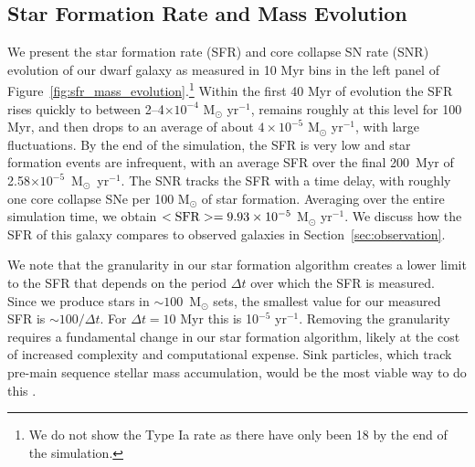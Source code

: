 \documentclass[twocolumn]{aastex61}
\begin{document}
\subsection{Star Formation Rate and Mass Evolution}
\label{sec:sfr}

We present the star formation rate (SFR) and core collapse SN rate (SNR) evolution of our dwarf galaxy as measured in 10 Myr bins in the left panel of Figure~\ref{fig:sfr_mass_evolution}.\footnote{We do not show the Type Ia rate as there have only been 18 by the end of the simulation.} Within the first 40 Myr of evolution the SFR rises quickly to between 2--4$ \times 10^{-4}$ M$_{\odot}$ yr$^{-1}$, remains roughly at this level for 100 Myr, and then drops to an average of about $4 \times 10^{-5}$ M$_{\odot}$ yr$^{-1}$, with large fluctuations. By the end of the simulation, the SFR is very low and star formation events are infrequent, with an average SFR over the final 200~Myr of 2.58$\times 10^{-5}$~M$_{\odot}$~yr$^{-1}$. The SNR tracks the SFR with a time delay, with roughly one core collapse SNe per 100 M$_{\odot}$ of star formation. Averaging over the entire simulation time, we obtain  $<\rm{SFR}> = 9.93 \times 10^{-5}$ M$_{\odot}$ yr$^{-1}$. We discuss how the SFR of this galaxy compares to observed galaxies in Section~\ref{sec:observation}.

We note that the granularity in our star formation algorithm creates a lower limit to the SFR that depends on the period $\Delta t$ over which the SFR is measured. Since we produce stars in $\sim 100$~M$_{\odot}$ sets, the smallest value for our measured SFR is $\sim 100/ \Delta t$. For $\Delta t = 10$ Myr this is 10$^{-5}$ yr$^{-1}$. Removing the granularity requires a fundamental change in our star formation algorithm, likely at the cost of increased complexity and computational expense. Sink particles, which track pre-main sequence stellar mass accumulation, would be the most viable way to do this \citep[see for example ][]{Krumholz2004,Federrath2010,GongOstriker2013,BleulerTeyssier2014,Sormani2017}.
\end{document}
